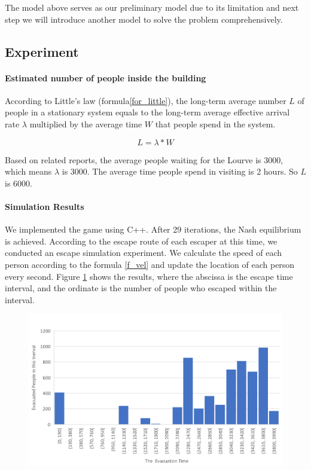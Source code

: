\documentclass{mcmthesis}
\begin{document}
		The model above serves as our preliminary model due to its limitation and next step we will introduce another model to solve the problem comprehensively.
	
\subsection{Experiment}

\paragraph{Estimated number of people inside the building}
According to Little's law (formula\ref{for_little}), the long-term average number $L$ of people in a stationary system equals to the long-term average effective arrival rate $\lambda$ multiplied by the average time $W$ that people spend in the system.

\begin{equation}
{L=\lambda*W}
\label{for_little}
\end{equation}

Based on related reports\cite{waittime}, the average people waiting for the Lourve is 3000, which means $\lambda$ is 3000. The average time people spend in visiting is 2 hours. So $L$ is 6000.



\paragraph{Simulation Results}
We implemented the game using C++. After 29 iterations, the Nash equilibrium is achieved.  According to the escape route of each escaper at this time, we conducted an escape simulation experiment. We calculate the speed of each person according to the formula \ref{f_vel} and update the location of each person every second. Figure \ref{fig:screenshot001} shows the results, where the abscissa is the escape time interval, and the ordinate is the number of people who escaped within the interval. 

\begin{figure}
	\centering
	\includegraphics[width=0.7\linewidth]{../../Figure/screenshot001}
	\caption{}
	\label{fig:screenshot001}
\end{figure}
\end{document}
